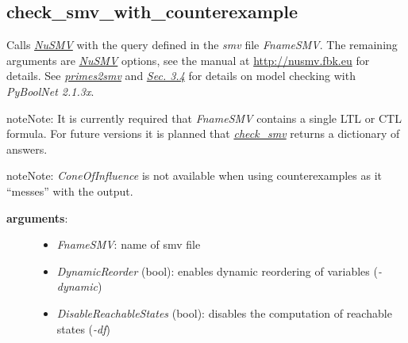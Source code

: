 \documentclass[letterpaper,10pt,english]{sphinxmanual}
\begin{document}
\subsection{check\_smv\_with\_counterexample}
\label{ModelChecking:id6}\label{ModelChecking:check-smv-with-counterexample}

\begin{fulllineitems}
\label{ModelChecking:PyBoolNet.ModelChecking.check_smv_with_counterexample}
Calls {\hyperref[Installation:installation-nusmv]{\emph{NuSMV}}} with the query defined in the \emph{smv} file \emph{FnameSMV}.
The remaining arguments are {\hyperref[Installation:installation-nusmv]{\emph{NuSMV}}} options, see the manual at \href{http://nusmv.fbk.eu}{http://nusmv.fbk.eu} for details.
See {\hyperref[ModelChecking:primes2smv]{\emph{primes2smv}}} and {\hyperref[Manual:sec-model-checking]{\emph{Sec. 3.4}}} for details on model checking with \emph{PyBoolNet 2.1.3x}.

\begin{notice}{note}{Note:}
It is currently required that \emph{FnameSMV} contains a single LTL or CTL formula.
For future versions it is planned that {\hyperref[ModelChecking:check-smv]{\emph{check\_smv}}} returns a dictionary of answers.
\end{notice}

\begin{notice}{note}{Note:}
\emph{ConeOfInfluence} is not available when using counterexamples as it ``messes'' with the output.
\end{notice}
\begin{description}
\item[{\textbf{arguments}:}] \leavevmode\begin{itemize}
\item {} 
\emph{FnameSMV}: name of smv file

\item {} 
\emph{DynamicReorder} (bool): enables dynamic reordering of variables (\emph{-dynamic})

\item {} 
\emph{DisableReachableStates} (bool): disables the computation of reachable states (\emph{-df})

\end{itemize}


\end{description}
\end{fulllineitems}
\end{document}
